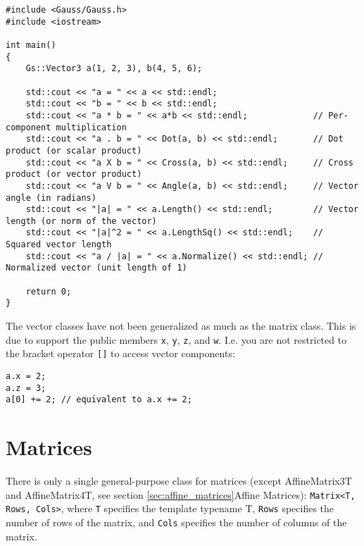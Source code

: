 \documentclass{article}
\begin{document}
\begin{lstlisting}
#include <Gauss/Gauss.h>
#include <iostream>

int main()
{
	Gs::Vector3 a(1, 2, 3), b(4, 5, 6);
	
	std::cout << "a = " << a << std::endl;
	std::cout << "b = " << b << std::endl;
	std::cout << "a * b = " << a*b << std::endl;             // Per-component multiplication
	std::cout << "a . b = " << Dot(a, b) << std::endl;       // Dot product (or scalar product)
	std::cout << "a X b = " << Cross(a, b) << std::endl;     // Cross product (or vector product)
	std::cout << "a V b = " << Angle(a, b) << std::endl;     // Vector angle (in radians)
	std::cout << "|a| = " << a.Length() << std::endl;        // Vector length (or norm of the vector)
	std::cout << "|a|^2 = " << a.LengthSq() << std::endl;    // Squared vector length
	std::cout << "a / |a| = " << a.Normalize() << std::endl; // Normalized vector (unit length of 1)
	
	return 0;
}
\end{lstlisting}
The vector classes have not been generalized as much as the matrix class. This is due to support the public members
\texttt{x}, \texttt{y}, \texttt{z}, and \texttt{w}. I.e. you are not restricted to the bracket operator \texttt{[]}
to access vector components:
\begin{lstlisting}
a.x = 2;
a.z = 3;
a[0] += 2; // equivalent to a.x += 2;
\end{lstlisting}



\section*{Matrices}

There is only a single general-purpose class for matrices
(except AffineMatrix3T and AffineMatrix4T, see section \ref{sec:affine_matrices}{Affine Matrices}):
\texttt{Matrix<T, Rows, Cols>}, where \texttt{T} specifies the template typename T, \texttt{Rows} specifies the
number of rows of the matrix, and \texttt{Cols} specifies the number of columns of the matrix.
\end{document}
